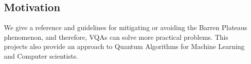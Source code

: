 \subsection{Motivation}

We give a reference and guidelines for mitigating or avoiding the Barren Plateaus phenomenon, and therefore, VQAs can solve more practical problems. This projects also provide an approach to Quantum Algorithms for Machine Learning and Computer scientists.